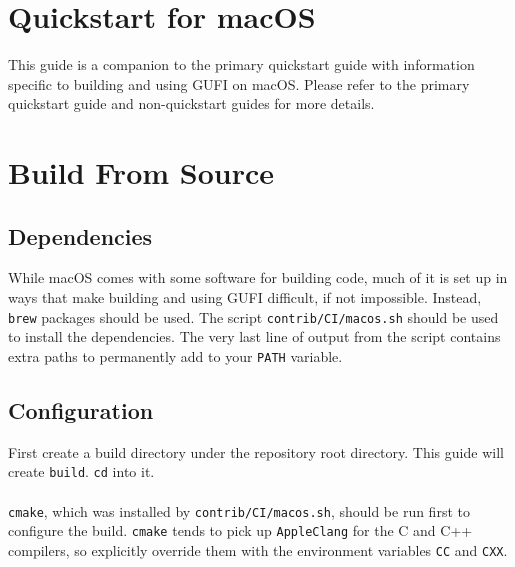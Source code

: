 \section{Quickstart for macOS}
This guide is a companion to the primary quickstart guide with
information specific to building and using GUFI on macOS. Please refer
to the primary quickstart guide and non-quickstart guides for more
details.

\section{Build From Source}
\subsection{Dependencies}
While macOS comes with some software for building code, much of it is
set up in ways that make building and using GUFI difficult, if not
impossible. Instead, \texttt{brew} packages should be used. The script
\texttt{contrib/CI/macos.sh} should be used to install the
dependencies. The very last line of output from the script contains
extra paths to permanently add to your \texttt{PATH} variable.

\subsection{Configuration}
First create a build directory under the repository root
directory. This guide will create \texttt{build}. \texttt{cd} into it.
\\\\
\texttt{cmake}, which was installed by \texttt{contrib/CI/macos.sh},
should be run first to configure the build. \texttt{cmake} tends to
pick up \texttt{AppleClang} for the C and C++ compilers, so explicitly
override them with the environment variables \texttt{CC} and
\texttt{CXX}.

